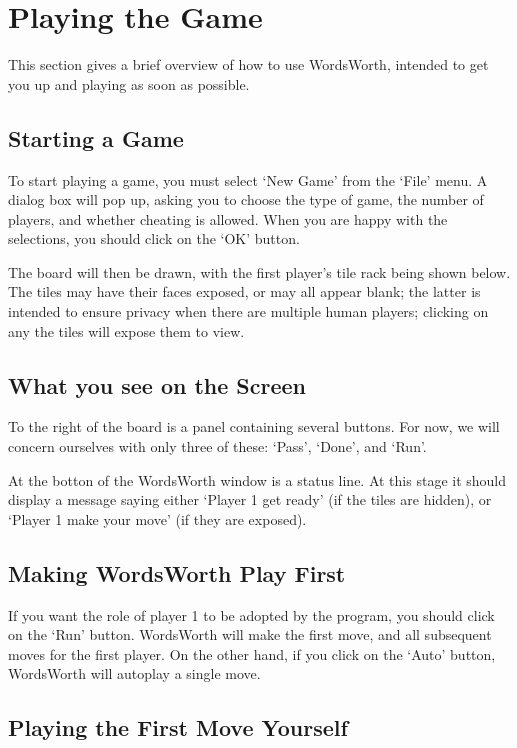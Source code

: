 \section{Playing the Game}

This section gives a brief overview of how to use WordsWorth,
intended to get you up and playing as soon as possible.

\subsection{Starting a Game}

To start playing a game, you must select `New Game' from the `File'
menu. A dialog box will pop up, asking you to choose the type of
game, the number of players, and whether cheating is allowed. When
you are happy with the selections, you should click on the `OK'
button.

The board will then be drawn, with the first player's tile rack being
shown below. The tiles may have their faces exposed, or may all
appear blank; the latter is intended to ensure privacy when there 
are multiple human players; clicking on any the tiles will expose
them to view.

\subsection{What you see on the Screen}

To the right of the board is a panel containing several buttons. For
now, we will concern ourselves with only three of these: `Pass',
`Done', and `Run'.

At the botton of the WordsWorth window is a status line. At this
stage it should display a message saying either `Player 1 get ready'
(if the tiles are hidden), or `Player 1 make your move' (if they
are exposed).

\subsection{Making WordsWorth Play First}

If you want the role of player 1 to be adopted by the
program, you should click on the `Run' button. WordsWorth will
make the first move, and all subsequent moves for the first player.
On the other hand, if you click on the `Auto' button, WordsWorth
will autoplay a single move.

\subsection{Playing the First Move Yourself}

